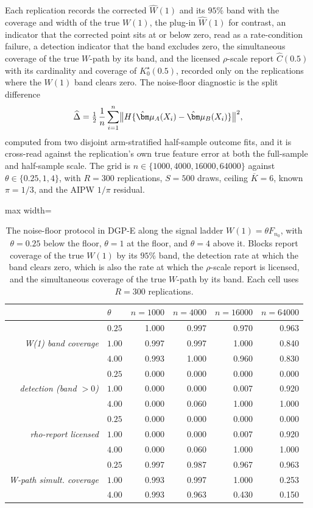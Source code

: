 \documentclass[11pt]{article}
\newcommand{\bmu}{\bm\mu}
\begin{document}
Each replication records the corrected $\widehat W(1)$ and its $95\%$ band with the coverage and width of the true $W(1)$, the plug-in $\widehat W(1)$ for contrast, an indicator that the corrected point sits at or below zero, read as a rate-condition failure, a detection indicator that the band excludes zero, the simultaneous coverage of the true $W$-path by its band, and the licensed $\rho$-scale report $\widehat C(0.5)$ with its cardinality and coverage of $K^\star_0(0.5)$, recorded only on the replications where the $W(1)$ band clears zero. The noise-floor diagnostic is the split difference
\[
\widehat\Delta=\tfrac12\,\frac1n\sum_{i=1}^n\bigl\|H\{\hat\bmu_A(X_i)-\hat\bmu_B(X_i)\}\bigr\|^2,
\]
computed from two disjoint arm-stratified half-sample outcome fits, and it is cross-read against the replication's own true feature error at both the full-sample and half-sample scale. The grid is $n\in\{1000,4000,16000,64000\}$ against $\theta\in\{0.25,1,4\}$, with $R=300$ replications, $S=500$ draws, ceiling $\overline K=6$, known $\pi=1/3$, and the AIPW $1/\pi$ residual.

\begin{table}[t]
\centering
\caption{The noise-floor protocol in DGP-E along the signal ladder $W(1)=\theta F_{n_0}$, with $\theta=0.25$ below the floor, $\theta=1$ at the floor, and $\theta=4$ above it. Blocks report coverage of the true $W(1)$ by its $95\%$ band, the detection rate at which the band clears zero, which is also the rate at which the $\rho$-scale report is licensed, and the simultaneous coverage of the true $W$-path by its band. Each cell uses $R=300$ replications.}
\label{tab:sims:study6}
\begin{adjustbox}{max width=\textwidth}
\begin{tabular}{rlrrrr}
\toprule
& $\theta$ & $n=1000$ & $n=4000$ & $n=16000$ & $n=64000$\\
\midrule
\multirow{3}{*}{\textit{W(1) band coverage}}
 & $0.25$ & 1.000 & 0.997 & 0.970 & 0.963\\
 & $1.00$ & 0.997 & 0.997 & 1.000 & 0.840\\
 & $4.00$ & 0.993 & 1.000 & 0.960 & 0.830\\
\midrule
\multirow{3}{*}{\textit{detection (band $>0$)}}
 & $0.25$ & 0.000 & 0.000 & 0.000 & 0.000\\
 & $1.00$ & 0.000 & 0.000 & 0.007 & 0.920\\
 & $4.00$ & 0.000 & 0.060 & 1.000 & 1.000\\
\midrule
\multirow{3}{*}{\textit{rho-report licensed}}
 & $0.25$ & 0.000 & 0.000 & 0.000 & 0.000\\
 & $1.00$ & 0.000 & 0.000 & 0.007 & 0.920\\
 & $4.00$ & 0.000 & 0.060 & 1.000 & 1.000\\
\midrule
\multirow{3}{*}{\textit{W-path simult. coverage}}
 & $0.25$ & 0.997 & 0.987 & 0.967 & 0.963\\
 & $1.00$ & 0.993 & 0.997 & 1.000 & 0.253\\
 & $4.00$ & 0.993 & 0.963 & 0.430 & 0.150\\
\bottomrule
\end{tabular}
\end{adjustbox}
\end{table}
\end{document}
